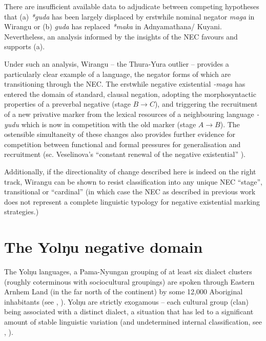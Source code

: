 \documentclass[output=paper,draft,draftmode,colorlinks,citecolor=brown]{langscibook}
\begin{document}
There are insufficient available data to adjudicate between competing
hypotheses that (a) \textit{*guda} has been largely displaced by erstwhile
nominal negator \textit{maga} in Wirangu or (b) \textit{guda}
has replaced \textit{*maka} in Adnyamathana\slash
Kuyani. Nevertheless, an analysis informed by the insights of the NEC favours and supports (a).
 
Under such an analysis, Wirangu -- the Thura-Yura outlier -- provides a particularly clear example of a language, the negator forms of which are transitioning through the NEC. The erstwhile negative existential \textit{-maga} has entered the domain of standard, clausal negation, adopting the morphosyntactic properties of a preverbal negative (stage $B\to C$), and triggering the recruitment of a new privative marker from the lexical resources of a neighbouring language \textit{-yudu} which is now in competition with the old marker (stage $A\to B$). The ostensible simultaneity of these changes also provides further evidence for competition between functional and formal pressures for generalisation and recruitment (sc. Veselinova's ``constant renewal of the negative existential'' \citeyearpar[173]{Veselinova2016}).

Additionally, if the directionality of change described here is indeed on
the right track, Wirangu can be shown to resist classification
into any unique NEC ``stage'', transitional or ``cardinal'' (in which case
the NEC as described in previous work does not represent a complete
linguistic typology for negative existential marking
strategies.)

\section{The Yolŋu negative domain}\label{sec:austr-4}

The Yolŋu languages, a Pama-Nyungan grouping of at least six dialect clusters (roughly coterminous with sociocultural groupings) are spoken through Eastern Arnhem Land (in the far north of the continent) by some 12,000 Aboriginal inhabitants (see \citealt[18ff]{Wilkinson1991}, \citealt{Bowern2009}). Yolŋu are strictly exogamous -- each cultural group (clan) being associated with a distinct dialect, a situation that has led to a significant amount of stable linguistic variation (and undetermined internal classification, see \citealt{Schebeck2001}, \citealt[836]{BowernAtkinson2012}).
\end{document}
